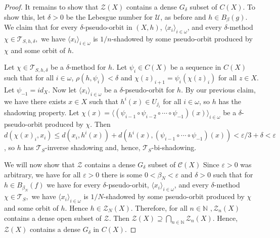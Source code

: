 \documentclass{amsart}
\numberwithin{equation}{section}
\begin{document}
\begin{proof}
It remains to show that $\mathcal{Z}(X) $ contains a dense $G_\delta$ subset of $C(X).$ To show this, let $\delta>0$ be the Lebesgue number for $\mathcal{U}$, as before and $h\in B_\beta(g)$. We claim that for every $\delta$-pseudo-orbit in $(X,h)$, $\langle x_i\rangle_{i\in \omega}$, and every $\delta$-method $\chi\in\mathcal{T}_{S,h,\delta}, $ we have $\langle x_i\rangle_{i\in \omega}$ is $1/n$-shadowed by some pseudo-orbit produced by $\chi$ and some orbit of $h$.

Let $\chi\in\mathcal{T}_{S,h,\delta}$ be a $\delta$-method for $h$. Let $\psi_i\in C(X)$ be a sequence in $C(X)$ such that for all $i\in \omega$, $\rho(h,\psi_i)<\delta$ and $\chi(z)_{i+1}= \psi_i(\chi(z)_i)$ for all $z\in X$. Let $\psi_{-1}=id_X.$ Now let $\langle x_i\rangle_{i\in \omega}$ be a $\delta$-pseudo-orbit for $h$. By our previous claim, we have there exists $x\in X$ such that $h^i(x) \in U_{j_i}$ for all $i\in \omega$, so $h$ has the shadowing property. Let $\chi(x) = \langle (\psi_{i-1}\circ\psi_{i-2}\circ\cdots \circ \psi_{-1})(x)\rangle_{i\in\omega} $ be a $\delta$-pseudo-orbit produced by $\chi.$ Then $d(\chi(x)_i,x_i)\leq d(x_i,h^i(x))+d(h^i(x),(\psi_{i-1}\circ\cdots \circ \psi_{-1})(x))<\varepsilon/3+\delta<\varepsilon$, so $h$ has $\mathcal{T}_S$-inverse shadowing and, hence, $\mathcal{T}_S$-bi-shadowing. 
    


    We will now show that $\mathcal{Z}$ contains a dense $G_\delta$ subset of $\mathcal C(X)$ Since $\varepsilon>0$ was arbitrary, we have for all $\varepsilon>0$ there is some $0<\beta_N<\varepsilon$ and $\delta>0$ such that for $h\in B_{\beta_N}(f)$ we have for every $\delta$-pseudo-orbit, $\langle x_i\rangle_{i\in \omega}$, and every $\delta$-method $\chi\in\mathcal{T}_{S}, $ we have $\langle x_i\rangle_{i\in \omega}$ is $1/N$-shadowed by some pseudo-orbit produced by $\chi$ and some orbit of $h$. Hence $h\in \mathcal{Z}_N(X)$. Therefore, for all $n\in \mathbb N$ $,\mathcal{Z}_n(X)$ contains a dense open subset of $\mathcal{Z}.$ Then $\mathcal{Z}(X)\supseteq \bigcap_{n\in \mathbb N}\mathcal{Z}_n(X).$ Hence, $\mathcal{Z}(X) $ contains a dense $G_\delta$ in $C(X).$
\end{proof}
\end{document}
